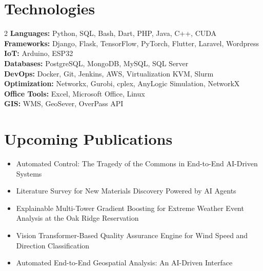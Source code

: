 \documentclass[10pt, letterpaper]{article}
\begin{document}
\section*{Technologies}
\small
\begin{multicols}{2}
    \textbf{Languages:} Python, SQL, Bash, Dart, PHP, Java, C++, CUDA \\
    \textbf{Frameworks:} Django, Flask, TensorFlow, PyTorch, Flutter, Laravel, Wordpress \\
    \textbf{IoT:} Arduino, ESP32 \\
    \textbf{Databases:} PostgreSQL, MongoDB, MySQL, SQL Server \\
    \textbf{DevOps:} Docker, Git, Jenkins, AWS, Virtualization KVM, Slurm \\
    \textbf{Optimization:} Networkx, Gurobi, cplex, AnyLogic Simulation, NetworkX \\
    \textbf{Office Tools:} Excel, Microsoft Office, Linux \\
    \textbf{GIS:} WMS, GeoSever, OverPass API \\
\end{multicols}



\section*{Upcoming Publications}
\small
\begin{itemize}[left=0pt]

    \item{Automated Control: The Tragedy of the Commons in End-to-End AI-Driven Systems}

     
    \item{Literature Survey for New Materials Discovery Powered by AI Agents}
    \item{Explainable Multi-Tower Gradient Boosting for Extreme Weather Event Analysis at the Oak Ridge Reservation}
\item{Vision Transformer-Based Quality Assurance Engine for Wind Speed and Direction Classification}
\item{Automated End-to-End Geospatial Analysis: An AI-Driven Interface}

\end{itemize}




 


    
\end{document}
